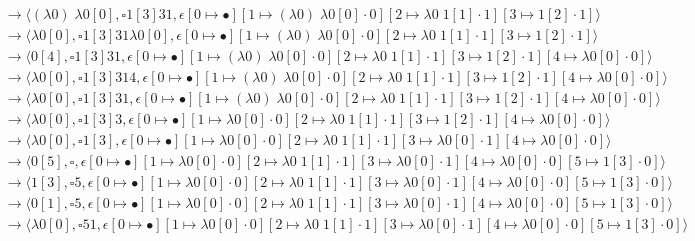 \begin{sidewaysfigure}
\ContinuedFloat
\begin{align*}
&\rightarrow \langle (\lambda0)\;\lambda0[0],\square 1[3] 3 1,\epsilon[0\mapsto\bullet][1\mapsto(\lambda0)\;\lambda0[0]\cdot0][2\mapsto\lambda0\;1[1]\cdot1][3\mapsto1[2]\cdot1]\rangle\\ 
&\rightarrow \langle \lambda0[0],\square 1[3] 3 1 \lambda0[0],\epsilon[0\mapsto\bullet][1\mapsto(\lambda0)\;\lambda0[0]\cdot0][2\mapsto\lambda0\;1[1]\cdot1][3\mapsto1[2]\cdot1]\rangle\\ 
&\rightarrow\langle 0[4],\square 1[3] 3 1,\epsilon[0\mapsto\bullet][1\mapsto(\lambda0)\;\lambda0[0]\cdot0][2\mapsto\lambda0\;1[1]\cdot1][3\mapsto1[2]\cdot1][4\mapsto\lambda0[0]\cdot0]\rangle\\ 
&\rightarrow\langle \lambda0[0],\square 1[3] 3 1 4,\epsilon[0\mapsto\bullet][1\mapsto(\lambda0)\;\lambda0[0]\cdot0][2\mapsto\lambda0\;1[1]\cdot1][3\mapsto1[2]\cdot1][4\mapsto\lambda0[0]\cdot0]\rangle\\ 
&\rightarrow\langle \lambda0[0],\square 1[3] 3 1,\epsilon[0\mapsto\bullet][1\mapsto(\lambda0)\;\lambda0[0]\cdot0][2\mapsto\lambda0\;1[1]\cdot1][3\mapsto1[2]\cdot1][4\mapsto\lambda0[0]\cdot0]\rangle\\ 
&\rightarrow\langle \lambda0[0],\square 1[3] 3,\epsilon[0\mapsto\bullet][1\mapsto\lambda0[0]\cdot0][2\mapsto\lambda0\;1[1]\cdot1][3\mapsto1[2]\cdot1][4\mapsto\lambda0[0]\cdot0]\rangle\\ 
&\rightarrow\langle \lambda0[0],\square 1[3],\epsilon[0\mapsto\bullet][1\mapsto\lambda0[0]\cdot0][2\mapsto\lambda0\;1[1]\cdot1][3\mapsto\lambda0[0]\cdot1][4\mapsto\lambda0[0]\cdot0]\rangle\\ 
&\rightarrow\langle 0[5],\square,\epsilon[0\mapsto\bullet][1\mapsto\lambda0[0]\cdot0][2\mapsto\lambda0\;1[1]\cdot1][3\mapsto\lambda0[0]\cdot1][4\mapsto\lambda0[0]\cdot0][5\mapsto1[3]\cdot0]\rangle\\ 
&\rightarrow\langle 1[3],\square 5,\epsilon[0\mapsto\bullet][1\mapsto\lambda0[0]\cdot0][2\mapsto\lambda0\;1[1]\cdot1][3\mapsto\lambda0[0]\cdot1][4\mapsto\lambda0[0]\cdot0][5\mapsto1[3]\cdot0]\rangle\\ 
&\rightarrow\langle 0[1],\square 5,\epsilon[0\mapsto\bullet][1\mapsto\lambda0[0]\cdot0][2\mapsto\lambda0\;1[1]\cdot1][3\mapsto\lambda0[0]\cdot1][4\mapsto\lambda0[0]\cdot0][5\mapsto1[3]\cdot0]\rangle\\ 
&\rightarrow\langle \lambda0[0],\square 5 1,\epsilon[0\mapsto\bullet][1\mapsto\lambda0[0]\cdot0][2\mapsto\lambda0\;1[1]\cdot1][3\mapsto\lambda0[0]\cdot1][4\mapsto\lambda0[0]\cdot0][5\mapsto1[3]\cdot0]\rangle\\ 

\end{align*}
\end{sidewaysfigure}
